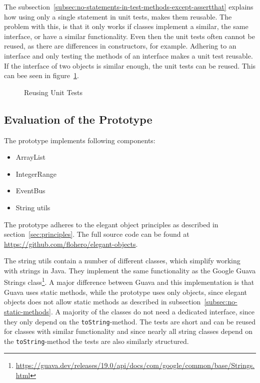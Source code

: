 The subsection\ \ref{subsec:no-statements-in-test-methods-except-assertthat} explains how using only a single statement in unit tests, makes them reusable.
The problem with this, is that it only works if classes implement a similar, the same interface, or have a similar functionality.
Even then the unit tests often cannot be reused, as there are differences in constructors, for example.
Adhering to an interface and only testing the methods of an interface makes a unit test reusable.
If the interface of two objects is similar enough, the unit tests can be reused.
This can bee seen in figure\ \ref{fig:reused-unit-tests}.

\begin{figure}[h]
    \caption{Reusing Unit Tests}
    
    
    \label{fig:reused-unit-tests}
\end{figure}

\subsection{Evaluation of the Prototype}\label{subsec:evaluation-of-the-prototype}
The prototype implements following components:
\begin{itemize}
    \item ArrayList
    \item IntegerRange
    \item EventBus
    \item String utils
\end{itemize}
The prototype adheres to the elegant object principles as described in section\ \ref{sec:principles}.
The full source code can be found at \url{https://github.com/flohero/elegant-objects}.

The string utils contain a number of different classes, which simplify working with strings in Java.
They implement the same functionality as the Google Guava Strings class\footnote{\url{https://guava.dev/releases/19.0/api/docs/com/google/common/base/Strings.html}}.
A major difference between Guava and this implementation is that Guava uses static methods, while the prototype uses only objects, since elegant objects does not allow static methods as described in subsection\ \ref{subsec:no-static-methods}.
A majority of the classes do not need a dedicated interface, since they only depend on the \texttt{toString}-method.
The tests are short and can be reused for classes with similar functionality and since nearly all string classes depend on the \texttt{toString}-method the tests are also similarly structured.

